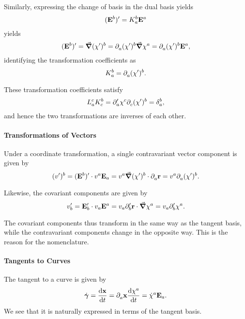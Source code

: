 Similarly, expressing the change of basis in the dual basis yields
\begin{align*}
	(\db{b})' = K_{a}^{b}\db{a}
\end{align*}
yields
\begin{align*}
	(\db{b})' = \grad{(\chi')^{b}} = \del{a}{(\chi')^{b}}\grad{\chi^{a}} = \del{a}{(\chi')^{b}}\db{a},
\end{align*}
identifying the transformation coefficients as
\begin{align*}
	K_{a}^{b} = \del{a}{(\chi')^{b}}.
\end{align*}

These transformation coefficients satisfy
\begin{align*}
	L_{a}^{c}K_{c}^{b} = \del[\prime]{a}{\chi^{c}}\del{c}{(\chi')^{b}} = \kdelta{a}{b},
\end{align*}
and hence the two transformations are inverses of each other.

\paragraph{Transformations of Vectors}
Under a coordinate transformation, a single contravariant vector component is given by
\begin{align*}
	(v')^{b} = (\db{b})'\cdot v^{a}\tb{a} = v^{a}\grad{(\chi')^{b}}\cdot\del{a}{\vb{r}} = v^{a}\del{a}{(\chi')^{b}}.
\end{align*}

Likewise, the covariant components are given by
\begin{align*}
	v_{b}' = \tb{b}'\cdot v_{a}\db{a} = v_{a}\del[\prime]{b}{\vb{r}}\cdot\grad{\chi^{a}} = v_{a}\del[\prime]{b}{\chi^{a}}.
\end{align*}

The covariant components thus transform in the same way as the tangent basis, while the contravariant components change in the opposite way. This is the reason for the nomenclature.

\paragraph{Tangents to Curves}
The tangent to a curve is given by
\begin{align*}
	\dot{\vb*{\gamma}} = \dv{\vb{x}}{t} = \del{a}{\vb{x}}\dv{\chi^{a}}{t} = \dot{\chi}^{a}\vb{E}_{a}.
\end{align*}
We see that it is naturally expressed in terms of the tangent basis.

